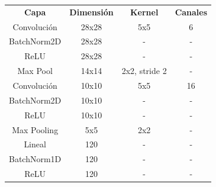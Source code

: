 \begin{table}[]
\centering
\begin{tabular}{|c|c|c|c|}
\hline
\multirow{2}{*}{\textbf{Capa}} & \multirow{2}{*}{\textbf{Dimensión}} & \multirow{2}{*}{\textbf{Kernel}} & \multirow{2}{*}{\textbf{Canales}} \\
                               &                                     &                                  &                                   \\ \hline
Convolución                    & 28x28                               & 5x5                              & 6                                 \\ \hline
BatchNorm2D                    & 28x28                               & -                                & -                                 \\ \hline
ReLU                           & 28x28                               & -                                & -                                 \\ \hline
Max Pool                       & 14x14                               & 2x2, stride 2                    & -                                 \\ \hline
Convolución                    & 10x10                               & 5x5                              & 16                                \\ \hline
BatchNorm2D                    & 10x10                               & -                                & -                                 \\ \hline
ReLU                           & 10x10                               & -                                & -                                 \\ \hline
Max Pooling                    & 5x5                                 & 2x2                              & -                                 \\ \hline
Lineal                         & 120                                 & -                                & -                                 \\ \hline
BatchNorm1D                    & 120                                 & -                                & -                                 \\ \hline
ReLU                           & 120                                 & -                                & -                                 \\ \hline

\end{tabular}
\end{table}
